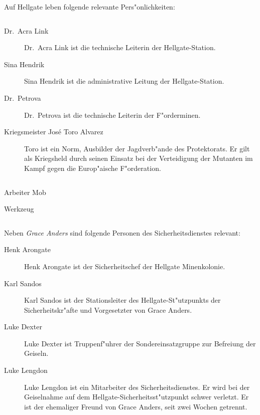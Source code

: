
Auf Hellgate leben folgende relevante Pers"onlichkeiten:

\begin{column}[l]{0.45}
    \begin{description}
        \item[Dr.~Acra Link] Dr.~Acra Link ist die technische Leiterin der Hellgate-Station.
        \item[Sina Hendrik] Sina Hendrik ist die administrative Leitung der Hellgate-Station.
        \item[Dr.~Petrova] Dr.~Petrova ist die technische Leiterin der F"orderminen.
        \item[Kriegsmeister Jos\'{e} \frqq{}Toro\flqq{} Alvarez] Toro ist ein Norm, Ausbilder der Jagdverb"ande des Protektorats. Er gilt 
            als Kriegsheld durch seinen Einsatz bei der Verteidigung der Mutanten im Kampf gegen die Europ"aische F"orderation.
    \end{description}
\end{column}
\begin{column}[r]{0.45}
    \begin{nscsheet}[h]{Arbeiter Mob}
        \nscstats[]
        \nscruler
        \begin{nscinventory}
            \nscitem[Waffen] Werkzeug
        \end{nscinventory}
    \end{nscsheet}
\end{column}


Neben \emph{Grace Anders} sind folgende Personen des Sicherheitsdienstes relevant:

\begin{description}
    \item[Henk Arongate] Henk Arongate ist der Sicherheitschef der Hellgate Minenkolonie.
    \item[Karl Sandos] Karl Sandos ist der Stationsleiter des Hellgate-St"utzpunkts der Sicherheitskr"afte und Vorgesetzter von Grace 
        Anders.
    \item[Luke Dexter] Luke Dexter ist Truppenf"uhrer der Sondereinsatzgruppe zur Befreiung der Geiseln.
    \item[Luke Lengdon] Luke Lengdon ist ein Mitarbeiter des Sicherheitsdienstes. Er wird bei der Geiselnahme auf dem 
        Hellgate-Sicherheitsst"utzpunkt schwer verletzt. Er ist der ehemaliger Freund von Grace Anders, seit zwei Wochen getrennt.
\end{description}

\vfill\pagebreak